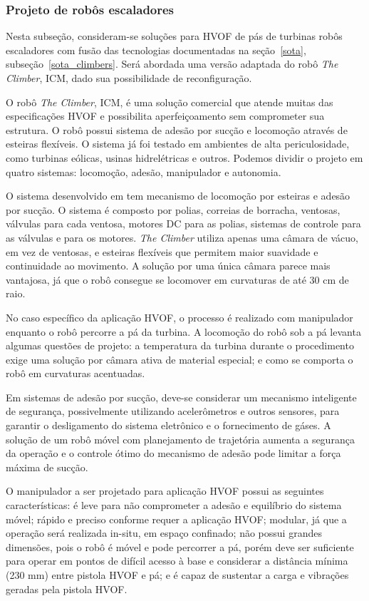 \subsubsection{Projeto de robôs escaladores}\label{proj_climbers}

Nesta subseção, consideram-se soluções para HVOF de pás de turbinas robôs
escaladores com fusão das tecnologias documentadas na
seção~\ref{sota}, subseção~\ref{sota_climbers}. Será abordada uma versão
adaptada do robô \emph{The Climber}, ICM, dado sua possibilidade de
reconfiguração.

O robô \emph{The Climber}, ICM, é uma solução comercial que atende muitas das
especificações HVOF e possibilita aperfeiçoamento sem comprometer sua
estrutura. O robô possui sistema de adesão por sucção e locomoção através de
esteiras flexíveis. O sistema já foi testado em ambientes de alta
periculosidade, como turbinas eólicas, usinas hidrelétricas e outros. Podemos
dividir o projeto em quatro sistemas: locomoção, adesão, manipulador e autonomia.

O sistema desenvolvido em \cite{kim2008development} tem mecanismo de
locomoção por esteiras e adesão por sucção. O sistema é composto por polias,
correias de borracha, ventosas, válvulas para cada ventosa, motores DC para as polias,
sistemas de controle para as válvulas e para os motores. \emph{The Climber}
utiliza apenas uma câmara de vácuo, em vez de ventosas, e esteiras flexíveis que
permitem maior suavidade e continuidade ao movimento. A solução por uma única
câmara parece mais vantajosa, já que o robô consegue se locomover em curvaturas
de até 30 cm de raio.

No caso específico da aplicação HVOF, o processo é realizado com
manipulador enquanto o robô percorre a pá da turbina. A locomoção do
robô sob a pá levanta algumas questões de projeto: a
temperatura da turbina durante o procedimento exige uma solução por câmara ativa 
de material especial; e como se comporta o robô em curvaturas
acentuadas. 

Em sistemas de adesão por sucção, deve-se considerar um mecanismo
inteligente de segurança, possivelmente utilizando acelerômetros e outros
sensores, para garantir o desligamento do sistema eletrônico e o fornecimento de
gáses. A solução de um robô móvel com planejamento de trajetória aumenta a
segurança da operação e o controle ótimo do mecanismo de adesão pode limitar a força máxima de sucção.

O manipulador a ser projetado para aplicação HVOF possui as seguintes
características: é leve para não comprometer a adesão e equilíbrio do sistema
móvel; rápido e preciso conforme requer a aplicação HVOF; modular, já
que a operação será realizada in-situ, em espaço confinado;
não possui grandes dimensões, pois o robô é móvel e pode
percorrer a pá, porém deve ser suficiente para operar em pontos de
difícil acesso à base e considerar a distância mínima (230 mm) entre pistola
HVOF e pá; e é capaz de sustentar a carga e vibrações geradas pela
pistola HVOF. 

